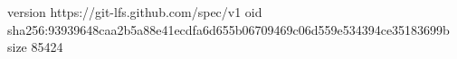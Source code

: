 version https://git-lfs.github.com/spec/v1
oid sha256:93939648caa2b5a88e41ecdfa6d655b06709469c06d559e534394ce35183699b
size 85424
